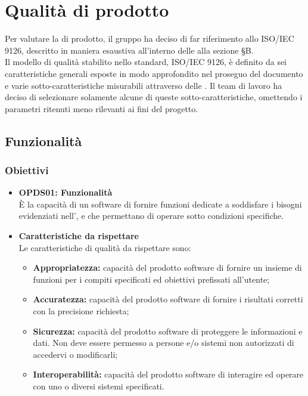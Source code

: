 \section{Qualità di prodotto}
\label{qualità_prodotto}
Per valutare la  di prodotto, il gruppo {\Gruppo} ha deciso di far riferimento allo  ISO/IEC 9126, descritto in maniera esaustiva all'interno delle  alla sezione \S{B}.\\
Il modello di qualità stabilito nello standard, ISO/IEC 9126, è definito da sei caratteristiche generali esposte in modo approfondito nel proseguo del documento e varie sotto-caratteristiche misurabili attraverso delle . Il team di lavoro ha deciso di selezionare solamente alcune di queste sotto-caratteristiche, omettendo i parametri ritenuti meno rilevanti ai fini del progetto.
\subsection{Funzionalità}
\subsubsection{Obiettivi}
\begin{itemize}
	\item \textbf{OPDS01: Funzionalità}\\
	È la capacità di un software di fornire funzioni dedicate a soddisfare i bisogni evidenziati nell'\AdR{}, e che permettano di operare sotto  condizioni specifiche.
	\item \textbf{Caratteristiche da rispettare}\\
	Le caratteristiche di qualità da rispettare sono:
	\begin{itemize}
		\item \textbf{Appropriatezza:} capacità del prodotto software di fornire un insieme di funzioni per i compiti specificati ed obiettivi prefissati all'utente;
		\item \textbf{Accuratezza:} capacità del prodotto software di fornire i risultati corretti con la precisione richiesta;
		\item \textbf{Sicurezza:} capacità del prodotto software di proteggere le informazioni e dati. Non deve essere permesso a persone e/o sistemi non autorizzati di accedervi o modificarli;
		\item \textbf{Interoperabilità:} capacità del prodotto software di interagire ed operare con uno o diversi sistemi specificati.
	\end{itemize}
\end{itemize}

